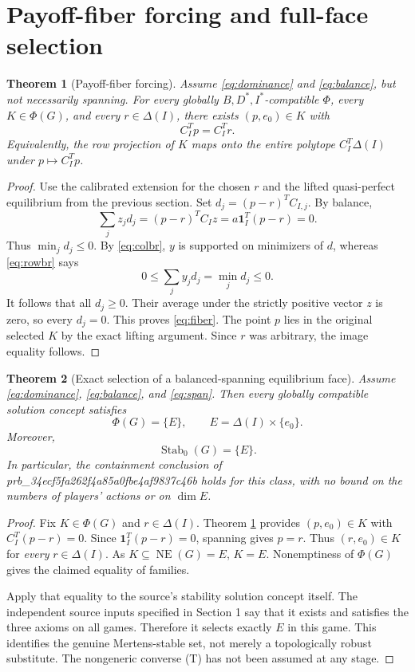 \documentclass[11pt]{article}
\newcommand{\NE}{\operatorname{NE}}
\newcommand{\Stab}{\operatorname{Stab}_0}
\newcommand{\one}{\mathbf 1}
\newtheorem{theorem}{Theorem}[section]
\theoremstyle{definition}
\theoremstyle{remark}
\begin{document}
\section{Payoff-fiber forcing and full-face selection}
\begin{theorem}[Payoff-fiber forcing]\label{thm:fiber}
Assume \eqref{eq:dominance} and \eqref{eq:balance}, but not necessarily
spanning. For every globally $B,D^*,I^*$-compatible $\Phi$, every
$K\in\Phi(G)$, and every $r\in\Delta(I)$, there exists
$(p,e_0)\in K$ with
\begin{equation}\label{eq:fiber}
 C_I^Tp=C_I^Tr.
\end{equation}
Equivalently, the row projection of $K$ maps onto the entire polytope
$C_I^T\Delta(I)$ under $p\mapsto C_I^Tp$.
\end{theorem}
\begin{proof}
Use the calibrated extension for the chosen $r$ and the lifted
quasi-perfect equilibrium from the previous section. Set
$d_j=(p-r)^TC_{I,j}$. By balance,
\[
 \sum_jz_jd_j=(p-r)^TC_Iz
 =a\one_I^T(p-r)=0.
\]
Thus $\min_jd_j\le0$. By \eqref{eq:colbr}, $y$ is supported on
minimizers of $d$, whereas \eqref{eq:rowbr} says
\[
 0\le\sum_jy_jd_j=\min_jd_j\le0.
\]
It follows that all $d_j\ge0$. Their average under the strictly positive
vector $z$ is zero, so every $d_j=0$. This proves \eqref{eq:fiber}.
The point $p$ lies in the original selected $K$ by the exact lifting
argument. Since $r$ was arbitrary, the image equality follows.
\end{proof}

\begin{theorem}[Exact selection of a balanced-spanning equilibrium face]
\label{thm:face}
Assume \eqref{eq:dominance}, \eqref{eq:balance}, and \eqref{eq:span}.
Then every globally compatible solution concept satisfies
\[
 \boxed{\Phi(G)=\{E\},\qquad E=\Delta(I)\times\{e_0\}.}
\]
Moreover,
\[
 \boxed{\Stab(G)=\{E\}.}
\]
In particular, the containment conclusion of prb_34ecf5fa262f4a85a0fbe4af9837c46b holds for this
class, with no bound on the numbers of players' actions or on $\dim E$.
\end{theorem}
\begin{proof}
Fix $K\in\Phi(G)$ and $r\in\Delta(I)$. Theorem \ref{thm:fiber}
provides $(p,e_0)\in K$ with $C_I^T(p-r)=0$. Since
$\one_I^T(p-r)=0$, spanning gives $p=r$. Thus $(r,e_0)\in K$ for
\emph{every} $r\in\Delta(I)$. As $K\subseteq\NE(G)=E$, $K=E$.
Nonemptiness of $\Phi(G)$ gives the claimed equality of families.

Apply that equality to the source's stability solution concept itself.
The independent source inputs specified in Section 1 say that it exists
and satisfies the three axioms on all games. Therefore it selects
exactly $E$ in this game. This identifies the genuine Mertens-stable
set, not merely a topologically robust substitute. The nongeneric
converse (T) has not been assumed at any stage.
\end{proof}
\end{document}
